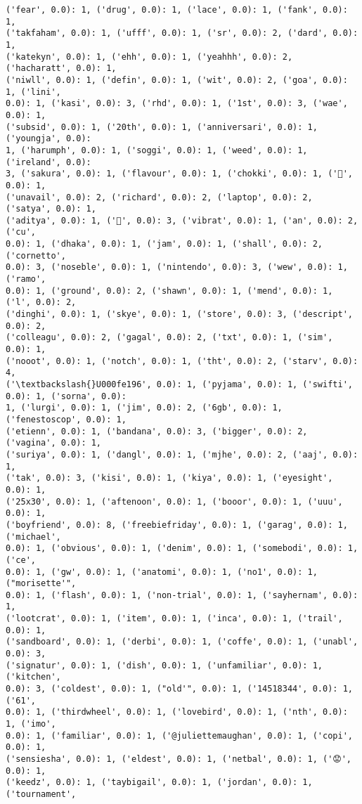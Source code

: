 \documentclass[11pt]{article}
\begin{document}
\begin{Verbatim}[commandchars=\\\{\}]
('fear', 0.0): 1, ('drug', 0.0): 1, ('lace', 0.0): 1, ('fank', 0.0): 1,
('takfaham', 0.0): 1, ('ufff', 0.0): 1, ('sr', 0.0): 2, ('dard', 0.0): 1,
('katekyn', 0.0): 1, ('ehh', 0.0): 1, ('yeahhh', 0.0): 2, ('hacharatt', 0.0): 1,
('niwll', 0.0): 1, ('defin', 0.0): 1, ('wit', 0.0): 2, ('goa', 0.0): 1, ('lini',
0.0): 1, ('kasi', 0.0): 3, ('rhd', 0.0): 1, ('1st', 0.0): 3, ('wae', 0.0): 1,
('subsid', 0.0): 1, ('20th', 0.0): 1, ('anniversari', 0.0): 1, ('youngja', 0.0):
1, ('harumph', 0.0): 1, ('soggi', 0.0): 1, ('weed', 0.0): 1, ('ireland', 0.0):
3, ('sakura', 0.0): 1, ('flavour', 0.0): 1, ('chokki', 0.0): 1, ('🌸', 0.0): 1,
('unavail', 0.0): 2, ('richard', 0.0): 2, ('laptop', 0.0): 2, ('satya', 0.0): 1,
('aditya', 0.0): 1, ('🍜', 0.0): 3, ('vibrat', 0.0): 1, ('an', 0.0): 2, ('cu',
0.0): 1, ('dhaka', 0.0): 1, ('jam', 0.0): 1, ('shall', 0.0): 2, ('cornetto',
0.0): 3, ('noseble', 0.0): 1, ('nintendo', 0.0): 3, ('wew', 0.0): 1, ('ramo',
0.0): 1, ('ground', 0.0): 2, ('shawn', 0.0): 1, ('mend', 0.0): 1, ('l', 0.0): 2,
('dinghi', 0.0): 1, ('skye', 0.0): 1, ('store', 0.0): 3, ('descript', 0.0): 2,
('colleagu', 0.0): 2, ('gagal', 0.0): 2, ('txt', 0.0): 1, ('sim', 0.0): 1,
('nooot', 0.0): 1, ('notch', 0.0): 1, ('tht', 0.0): 2, ('starv', 0.0): 4,
('\textbackslash{}U000fe196', 0.0): 1, ('pyjama', 0.0): 1, ('swifti', 0.0): 1, ('sorna', 0.0):
1, ('lurgi', 0.0): 1, ('jim', 0.0): 2, ('6gb', 0.0): 1, ('fenestoscop', 0.0): 1,
('etienn', 0.0): 1, ('bandana', 0.0): 3, ('bigger', 0.0): 2, ('vagina', 0.0): 1,
('suriya', 0.0): 1, ('dangl', 0.0): 1, ('mjhe', 0.0): 2, ('aaj', 0.0): 1,
('tak', 0.0): 3, ('kisi', 0.0): 1, ('kiya', 0.0): 1, ('eyesight', 0.0): 1,
('25x30', 0.0): 1, ('aftenoon', 0.0): 1, ('booor', 0.0): 1, ('uuu', 0.0): 1,
('boyfriend', 0.0): 8, ('freebiefriday', 0.0): 1, ('garag', 0.0): 1, ('michael',
0.0): 1, ('obvious', 0.0): 1, ('denim', 0.0): 1, ('somebodi', 0.0): 1, ('ce',
0.0): 1, ('gw', 0.0): 1, ('anatomi', 0.0): 1, ('no1', 0.0): 1, ("morisette'",
0.0): 1, ('flash', 0.0): 1, ('non-trial', 0.0): 1, ('sayhernam', 0.0): 1,
('lootcrat', 0.0): 1, ('item', 0.0): 1, ('inca', 0.0): 1, ('trail', 0.0): 1,
('sandboard', 0.0): 1, ('derbi', 0.0): 1, ('coffe', 0.0): 1, ('unabl', 0.0): 3,
('signatur', 0.0): 1, ('dish', 0.0): 1, ('unfamiliar', 0.0): 1, ('kitchen',
0.0): 3, ('coldest', 0.0): 1, ("old'", 0.0): 1, ('14518344', 0.0): 1, ('61',
0.0): 1, ('thirdwheel', 0.0): 1, ('lovebird', 0.0): 1, ('nth', 0.0): 1, ('imo',
0.0): 1, ('familiar', 0.0): 1, ('@juliettemaughan', 0.0): 1, ('copi', 0.0): 1,
('sensiesha', 0.0): 1, ('eldest', 0.0): 1, ('netbal', 0.0): 1, ('😟', 0.0): 1,
('keedz', 0.0): 1, ('taybigail', 0.0): 1, ('jordan', 0.0): 1, ('tournament',

\end{Verbatim}
\end{document}
